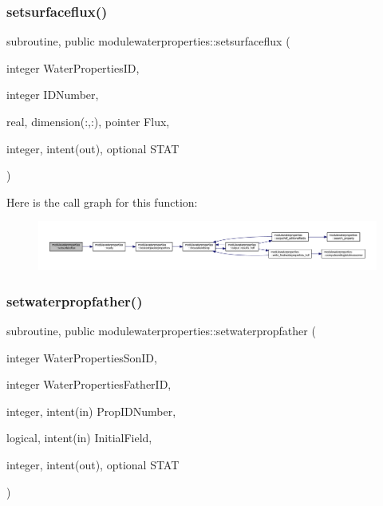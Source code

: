 \subsubsection{\texorpdfstring{setsurfaceflux()}{setsurfaceflux()}}
{\footnotesize\ttfamily subroutine, public modulewaterproperties\+::setsurfaceflux (\begin{DoxyParamCaption}\item[{integer}]{Water\+Properties\+ID,  }\item[{integer}]{I\+D\+Number,  }\item[{real, dimension(\+:,\+:), pointer}]{Flux,  }\item[{integer, intent(out), optional}]{S\+T\+AT }\end{DoxyParamCaption})}

Here is the call graph for this function\+:\nopagebreak
\begin{figure}[H]
\begin{center}
\leavevmode
\includegraphics[width=350pt]{namespacemodulewaterproperties_a2550f7996bf177225c3f5a9830c86707_cgraph}
\end{center}
\end{figure}
\mbox{\label{namespacemodulewaterproperties_abab3678d93906f85e9e8392ced1e6ab4}} 
\subsubsection{\texorpdfstring{setwaterpropfather()}{setwaterpropfather()}}
{\footnotesize\ttfamily subroutine, public modulewaterproperties\+::setwaterpropfather (\begin{DoxyParamCaption}\item[{integer}]{Water\+Properties\+Son\+ID,  }\item[{integer}]{Water\+Properties\+Father\+ID,  }\item[{integer, intent(in)}]{Prop\+I\+D\+Number,  }\item[{logical, intent(in)}]{Initial\+Field,  }\item[{integer, intent(out), optional}]{S\+T\+AT }\end{DoxyParamCaption})}

